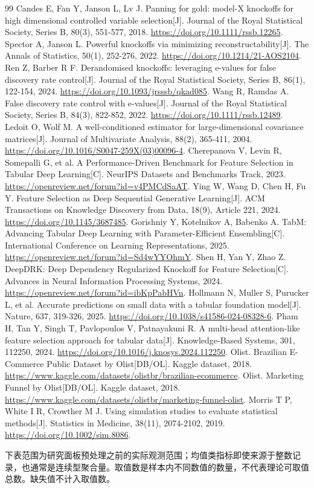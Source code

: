 \documentclass{sufethesismas}
\begin{document}
\begin{thebibliography}{99}
 Candes E, Fan Y, Janson L, Lv J. Panning for gold: model-X knockoffs for high dimensional controlled variable selection[J]. Journal of the Royal Statistical Society, Series B, 80(3), 551-577, 2018. \url{https://doi.org/10.1111/rssb.12265}.
 Spector A, Janson L. Powerful knockoffs via minimizing reconstructability[J]. The Annals of Statistics, 50(1), 252-276, 2022. \url{https://doi.org/10.1214/21-AOS2104}.
 Ren Z, Barber R F. Derandomised knockoffs: leveraging e-values for false discovery rate control[J]. Journal of the Royal Statistical Society, Series B, 86(1), 122-154, 2024. \url{https://doi.org/10.1093/jrsssb/qkad085}.
 Wang R, Ramdas A. False discovery rate control with e-values[J]. Journal of the Royal Statistical Society, Series B, 84(3), 822-852, 2022. \url{https://doi.org/10.1111/rssb.12489}.
 Ledoit O, Wolf M. A well-conditioned estimator for large-dimensional covariance matrices[J]. Journal of Multivariate Analysis, 88(2), 365-411, 2004. \url{https://doi.org/10.1016/S0047-259X(03)00096-4}.
 Cherepanova V, Levin R, Somepalli G, et al. A Performance-Driven Benchmark for Feature Selection in Tabular Deep Learning[C]. NeurIPS Datasets and Benchmarks Track, 2023. \url{https://openreview.net/forum?id=v4PMCdSaAT}.
 Ying W, Wang D, Chen H, Fu Y. Feature Selection as Deep Sequential Generative Learning[J]. ACM Transactions on Knowledge Discovery from Data, 18(9), Article 221, 2024. \url{https://doi.org/10.1145/3687485}.
 Gorishniy Y, Kotelnikov A, Babenko A. TabM: Advancing Tabular Deep Learning with Parameter-Efficient Ensembling[C]. International Conference on Learning Representations, 2025. \url{https://openreview.net/forum?id=Sd4wYYOhmY}.
 Shen H, Yan Y, Zhao Z. DeepDRK: Deep Dependency Regularized Knockoff for Feature Selection[C]. Advances in Neural Information Processing Systems, 2024. \url{https://openreview.net/forum?id=ibKpPabHVn}.
 Hollmann N, Muller S, Purucker L, et al. Accurate predictions on small data with a tabular foundation model[J]. Nature, 637, 319-326, 2025. \url{https://doi.org/10.1038/s41586-024-08328-6}.
 Pham H, Tan Y, Singh T, Pavlopoulos V, Patnayakuni R. A multi-head attention-like feature selection approach for tabular data[J]. Knowledge-Based Systems, 301, 112250, 2024. \url{https://doi.org/10.1016/j.knosys.2024.112250}.
 Olist. Brazilian E-Commerce Public Dataset by Olist[DB/OL]. Kaggle dataset, 2018. \url{https://www.kaggle.com/datasets/olistbr/brazilian-ecommerce}.
 Olist. Marketing Funnel by Olist[DB/OL]. Kaggle dataset, 2018. \url{https://www.kaggle.com/datasets/olistbr/marketing-funnel-olist}.
 Morris T P, White I R, Crowther M J. Using simulation studies to evaluate statistical methods[J]. Statistics in Medicine, 38(11), 2074-2102, 2019. \url{https://doi.org/10.1002/sim.8086}.
\end{thebibliography}
下表范围为研究面板预处理之前的实际观测范围；均值类指标即使来源于整数记录，也通常是连续型聚合量。取值数是样本内不同数值的数量，不代表理论可取值总数。缺失值不计入取值数。
\end{document}

